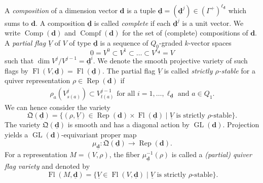 \documentclass{amsart}
\theoremstyle{plain}
\theoremstyle{TheoremNum}
\theoremstyle{definition}
\theoremstyle{remark}
\numberwithin{equation}{section}
\newcommand{\QQ}{\mathfrak{Q}}
\newcommand{\GL}{\operatorname{GL}}
\newcommand{\Fl}{\operatorname{Fl}}
\newcommand{\Comp}{\operatorname{Comp}}
\newcommand{\Compf}{\operatorname{Compf}}
\newcommand{\Rep}{\operatorname{Rep}}
\begin{document}
A \emph{composition} of a dimension vector $\mathbf{d}$ is a tuple 
$\underline{\mathbf{d}}=(\underline{\mathbf{d}}^j)\in (\Gamma^+)^{\ell_{\underline{\mathbf{d}}}}$ 
which sums to $\mathbf{d}.$ A composition $\underline{\mathbf{d}}$ is called \emph{complete} if each $\underline{\mathbf{d}}^j$ is a unit vector.
We write $\Comp(\mathbf{d})$ and $\Compf(\mathbf{d})$ for the set of (complete) compositions of $\mathbf{d}.$ A \emph{partial flag} $\underline{V}$ of $V$ of type $\underline{\mathbf{d}}$ is a sequence of $Q_0$-graded $k$-vector spaces
$$0=V^0\subset V^1\subset\dots\subset V^{\ell_{\underline{\mathbf{d}}}}=V$$
such that $\dim V^j/V^{j-1}=\underline{\mathbf{d}}^i.$ We denote the smooth projective variety of such flags by $\Fl(V,\underline{\mathbf{d}})=\Fl(\underline{\mathbf{d}}).$
The partial flag $\underline{V}$ is called \emph{strictly $\rho$-stable} for a quiver representation $\rho\in \Rep(\mathbf{d})$ if 
\begin{align}
    \rho_a(V^j_{s(a)})\subset V^{j-1}_{t(a)}\text{ for all } i=1,\dots,\ell_{\underline{\mathbf{d}}}\text{ and } a\in Q_1. \label{eq:strictlystable}
\end{align}
We can hence consider the variety
$$\QQ(\underline{\mathbf{d}})=\{(\rho,\underline{V})\in \Rep(\mathbf{d})\times \Fl(\underline{\mathbf{d}}) \mid \underline{V}\text{ is strictly $\rho$-stable}\}.$$
The variety $\QQ(\underline{\mathbf{d}})$ is smooth and has a diagonal action by $\GL(\mathbf{d}).$  Projection yields a $\GL(\mathbf{d})$-equivariant proper map
$$\mu_{\underline{\mathbf{d}}}:\QQ(\underline{\mathbf{d}})\to \Rep(\mathbf{d}).$$
For a representation $M=(V,\rho)$, the fiber $\mu_{\underline{\mathbf{d}}}^{-1}(\rho)$ is called a \emph{(partial) quiver flag variety} and denoted by
$$\Fl(M,\underline{\mathbf{d}})=\{\underline{V}\in \Fl(V,\underline{\mathbf{d}})\mid \underline {V}\text{ is strictly $\rho$-stable}\}.$$
\end{document}
